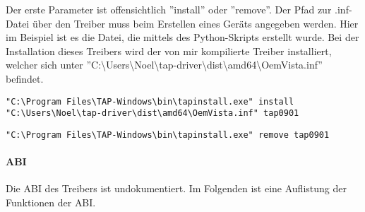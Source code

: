 Der erste Parameter ist offensichtlich ''install'' oder ''remove''. Der Pfad zur .inf-Datei
über den Treiber muss beim Erstellen eines Geräts angegeben werden. Hier im Beispiel
ist es die Datei, die mittels des Python-Skripts erstellt wurde. Bei der Installation
dieses Treibers wird der von mir kompilierte Treiber installiert, welcher sich unter 
''C:\textbackslash{}Users\textbackslash{}Noel\textbackslash{}tap-driver\textbackslash{}dist\textbackslash{}amd64\textbackslash{}OemVista.inf''
befindet.

\begin{lstlisting}[caption=Erstellung eines TAP-Geraets]
"C:\Program Files\TAP-Windows\bin\tapinstall.exe" install "C:\Users\Noel\tap-driver\dist\amd64\OemVista.inf" tap0901
\end{lstlisting}

\begin{lstlisting}[caption=Löschung aller TAP-Geraete]
"C:\Program Files\TAP-Windows\bin\tapinstall.exe" remove tap0901
\end{lstlisting}

\paragraph{ABI}
Die \ac{ABI} des Treibers ist undokumentiert. Im Folgenden ist eine Auflistung
der Funktionen der \ac{ABI}.


